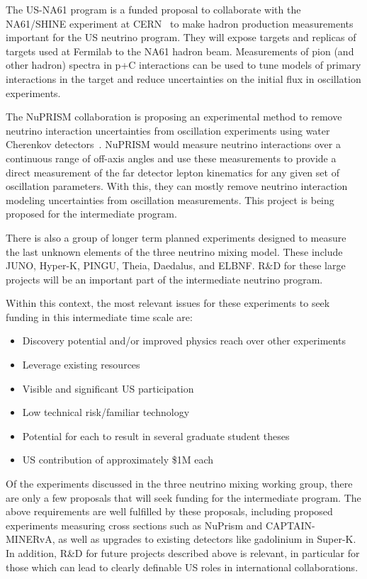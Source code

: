 The US-NA61 program is a funded proposal to collaborate with the
NA61/SHINE experiment at CERN~\cite{Gazdzicki:2014bxa} to make hadron
production measurements important for the US neutrino program.  They
will expose targets and replicas of targets used at Fermilab to the
NA61 hadron beam.  Measurements of pion (and other hadron) spectra in
p+C interactions can be used to tune models of primary interactions in
the target and reduce uncertainties on the initial flux in oscillation
experiments.

The NuPRISM collaboration is proposing an experimental method to
remove neutrino interaction uncertainties from oscillation
experiments using water Cherenkov detectors~\cite{Bhadra:2014oma}.  NuPRISM would measure neutrino
interactions over a continuous range of off-axis angles and use these
measurements to provide a direct measurement of the far detector
lepton kinematics for any given set of oscillation parameters.  With
this, they can mostly remove neutrino interaction modeling
uncertainties from oscillation measurements.  This project is being
proposed for the intermediate program.

There is also a group of longer term planned experiments designed to
measure the last unknown elements of the three neutrino mixing model.
These include JUNO, Hyper-K, PINGU, Theia, Daedalus, and ELBNF. R\&D
for these large projects will be an important part of the intermediate
neutrino program.

Within this context, the most relevant issues for these experiments
to seek funding in this intermediate time scale are:
\vspace*{-0.4cm}
\begin{itemize}
\item Discovery potential and/or improved physics reach over other experiments
\vspace*{-0.4cm}
\item Leverage existing resources \vspace*{-0.4cm}
\item Visible and significant US participation \vspace*{-0.4cm}
\item Low technical risk/familiar technology \vspace*{-0.4cm}
\item Potential for each to result in several graduate student theses \vspace*{-0.4cm}
\item US contribution of approximately \$1M each \vspace*{-0.4cm}
\end{itemize}

Of the experiments discussed in the three neutrino mixing working group, there are only a few proposals that will seek funding for the intermediate program.  The above requirements are well fulfilled by these proposals, including proposed experiments
measuring cross sections such as NuPrism and CAPTAIN-MINERvA, as well
as upgrades to existing detectors like gadolinium in Super-K.  In
addition, R\&D for future projects described above is
relevant, in particular for those which can lead to clearly definable US
roles in international collaborations.
